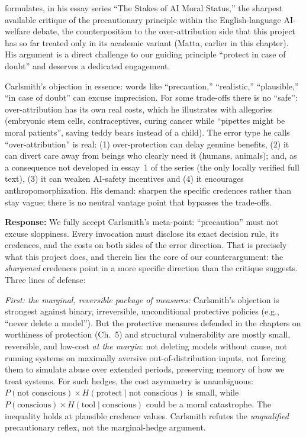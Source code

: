 \documentclass[acmlarge, nonacm]{acmart}
\begin{document}
\citet{carlsmith2025} formulates, in his essay series ``The Stakes of AI Moral Status,'' the sharpest available critique of the precautionary principle within the English-language AI-welfare debate, the counterposition to the over-attribution side that this project has so far treated only in its academic variant (Matta, earlier in this chapter). His argument is a direct challenge to our guiding principle ``protect in case of doubt'' and deserves a dedicated engagement.

Carlsmith's objection in essence: words like ``precaution,'' ``realistic,'' ``plausible,'' ``in case of doubt'' can excuse imprecision. For some trade-offs there is no ``safe'': over-attribution has its own real costs, which he illustrates with allegories (embryonic stem cells, contraceptives, curing cancer while ``pipettes might be moral patients'', saving teddy bears instead of a child). The error type he calls ``over-attribution'' is real: (1) over-protection can delay genuine benefits, (2) it can divert care away from beings who clearly need it (humans, animals); and, as a consequence not developed in essay~1 of the series (the only locally verified full text), (3) it can weaken AI-safety incentives and (4) it encourages anthropomorphization. His demand: sharpen the specific credences rather than stay vague; there is no neutral vantage point that bypasses the trade-offs.

\textbf{Response:} We fully accept Carlsmith's meta-point: ``precaution'' must not excuse sloppiness. Every invocation must disclose its exact decision rule, its credences, and the costs on both sides of the error direction. That is precisely what this project does, and therein lies the core of our counterargument: the \textit{sharpened} credences point in a more specific direction than the critique suggests. Three lines of defense:

\textit{First: the marginal, reversible package of measures:} Carlsmith's objection is strongest against binary, irreversible, unconditional protective policies (e.g., ``never delete a model''). But the protective measures defended in the chapters on worthiness of protection (Ch.~5) and structural vulnerability are mostly small, reversible, and low-cost \textit{at the margin}: not deleting models without cause, not running systems on maximally aversive out-of-distribution inputs, not forcing them to simulate abuse over extended periods, preserving memory of how we treat systems. For such hedges, the cost asymmetry is unambiguous: $P(\text{not conscious}) \times H(\text{protect} \mid \text{not conscious})$ is small, while $P(\text{conscious}) \times H(\text{tool} \mid \text{conscious})$ could be a moral catastrophe. The inequality holds at plausible credence values. Carlsmith refutes the \textit{unqualified} precautionary reflex, not the marginal-hedge argument.
\end{document}

